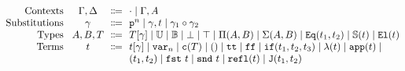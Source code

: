
\renewcommand{\Rule}[3][]{
    \pgfkeys{/Rule, default, #1}%
    \ifthenelse{\equal{\inferrulevskip}{default}}{%
        \mprset{vskip=}%
    }{%
        \mprset{vskip=\inferrulevskip}
    }%
    \ifthenelse{\equal{\inferrulesep}{default}}{%
        \mprset{sep=3ex}%
    }{%
        \mprset{sep=\inferrulesep}
    }%
        \ensuremath{\inferrule{#2}{#3}}%
}

\newcommand{\RuleWithName}[3][]{
    \pgfkeys{/Rule, default, #1}%
    \ifthenelse{\equal{\inferrulevskip}{default}}{%
        \mprset{vskip=}%
    }{%
        \mprset{vskip=\inferrulevskip}
    }%
    \ifthenelse{\equal{\inferrulesep}{default}}{%
        \mprset{sep=3ex}%
    }{%
        \mprset{sep=\inferrulesep}
    }%
    \ifthenelse{\equal{\inferrulename}{0}}{%
        \ensuremath{\inferrule{#2}{#3}}%
    }{%
        \ifthenelse{\equal{\inferrulelabel}{0}}{\ensuremath{%
            \inferrule*[lab={\rulelbl{\inferrulename}}]{#2}{#3}
        }}{\ensuremath{%
            \inferrule*[lab={\rulelbl[\inferrulelabel]{\inferrulename}}]{#2}{#3}
        }}%
    }%
}



\begin{gather*}
  \begin{array}{@{}r@{\hspace{2ex}}c@{\ \ }c@{\ \ }l@{}}
  \text{Contexts} & \Gm, \Dl &\Coloneqq &
      \cdot \mid \Gm, A
      \\ 
  \text{Substitutions} & \gm &\Coloneqq &
      \SubstWeak{n} \mid \SubstExt{\gm}{t} \mid \SubstComp{\gm_1}{\gm_2}
      \\
  \text{Types} & A, B, T  &\Coloneqq &
      \sub{T}{\gm} \mid
      \cU \mid \cB \mid \bot \mid \top \mid \TyPi{A}{B} \mid \TySigma{A}{B} \mid \TyId{t_1}{t_2} \mid \TyS{t} \mid \El{t}
      \\
  \text{Terms} & t &\Coloneqq &
      \sub{t}{\gm} \mid \var{n} \mid \codety{T} \mid \unit \mid \true \mid \false \mid \ifb{t_1}{t_2}{t_3} \mid \lam{t} \mid \app{t} \mid 
      \\ &&&
      \pair{t_1}{t_2} \mid \fst{t} \mid \snd{t} \mid \eqrefl{t} \mid  \Jeq{t_1}{t_2}
  \end{array}
\end{gather*}
  

